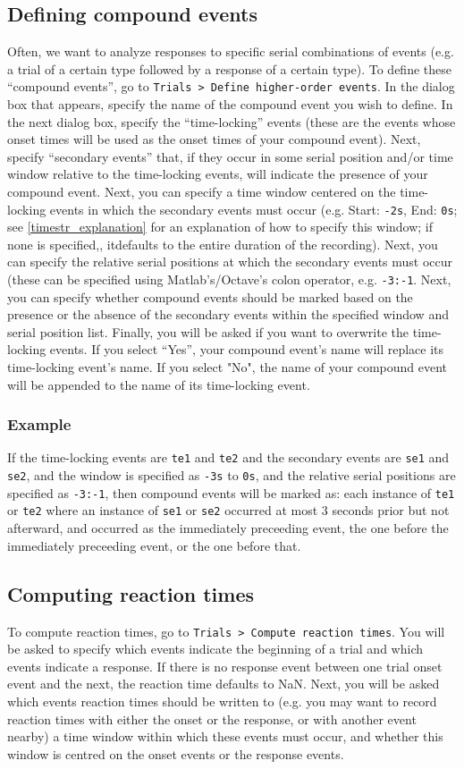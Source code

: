 \documentclass{article}
\begin{document}
\subsection{Defining compound events}
Often, we want to analyze responses to specific serial combinations of events (e.g. a trial of a certain type followed by a response of a certain type). To define these ``compound events'', go to \texttt{Trials > Define higher-order events}. In the dialog box that appears, specify the name of the compound event you wish to define. In the next dialog box, specify the ``time-locking'' events (these are the events whose onset times will be used as the onset times of your compound event). Next, specify ``secondary events'' that, if they occur in some serial position and/or time window relative to the time-locking events, will indicate the presence of your compound event. Next, you can specify a time window centered on the time-locking events in which the secondary events must occur (e.g. Start: \texttt{-2s}, End: \texttt{0s}; see \ref{timestr_explanation} for an explanation of how to specify this window; if none is specified,, itdefaults to the entire duration of the recording).  Next, you can specify the relative serial positions at which the secondary events must occur (these can be specified using Matlab's/Octave's colon operator, e.g. \texttt{-3:-1}. Next, you can specify whether compound events should be marked based on the presence or the absence of the secondary events within the specified window and serial position list. Finally, you will be asked if you want to overwrite the time-locking events. If you select ``Yes'', your compound event's name will replace its time-locking event's name. If you select "No", the name of your compound event will be appended to the name of its time-locking event.
\subsubsection{Example}
If the time-locking events are \texttt{te1} and \texttt{te2} and the secondary events are \texttt{se1} and \texttt{se2}, and the window is specified as \texttt{-3s} to \texttt{0s}, and the relative serial positions are specified as \texttt{-3:-1}, then compound events will be marked as: each instance of \texttt{te1} or \texttt{te2} where an instance of \texttt{se1} or \texttt{se2} occurred at most 3 seconds prior but not afterward, and occurred as the immediately preceeding event, the one before the immediately preceeding event, or the one before that.
\subsection{Computing reaction times}
To compute reaction times, go to \texttt{Trials > Compute reaction times}. You will be asked to specify which events indicate the beginning of a trial and which events indicate a response. If there is no response event between one trial onset event and the next, the reaction time defaults to NaN. Next, you will be asked which events reaction times should be written to (e.g. you may want to record reaction times with either the onset or the response, or with another event nearby) a time window within which these events must occur, and whether this window is centred on the onset events or the response events.
\end{document}
